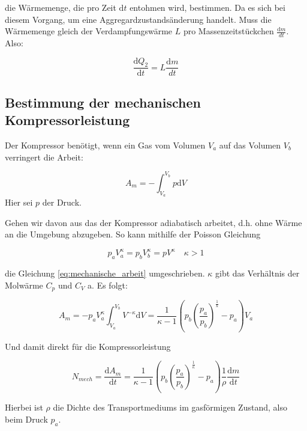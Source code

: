 die Wärmemenge, die pro Zeit $\mathup{d}t$ entohmen wird, bestimmen.
Da es sich bei diesem Vorgang, um eine Aggregardzustandsänderung handelt.
Muss die Wärmemenge gleich der Verdampfungswärme $L$ pro Massenzeitstückchen $\frac{\mathup{d}m}{dt}$.
Also:

\begin{equation*}
\frac{\mathup{d} Q_2}{\mathup{d} t}=L\frac{\mathup{d}m}{dt}
\end{equation*}

\subsection{Bestimmung der mechanischen Kompressorleistung}

Der Kompressor benötigt, wenn ein Gas vom Volumen $V_a$ auf das Volumen $V_b$ verringert
die Arbeit:

\begin{equation}
\label{eq:mechanische_arbeit}
A_m=-\int_{V_a}^{V_b}p\mathup{d}V
\end{equation}
Hier sei $p$ der Druck.

Gehen wir davon aus das der Kompressor adiabatisch arbeitet,
d.h. ohne Wärme an die Umgebung abzugeben. 
So kann mithilfe der Poisson Gleichung

\begin{equation*}
p_aV^{\kappa}_a=p_bV^{\kappa}_b=pV^{\kappa} \quad \kappa>1
\end{equation*}

die Gleichung \eqref{eq:mechanische_arbeit} umgeschrieben.
$\kappa$ gibt das Verhältnis der Molwärme $C_p$ und $C_V$ a.
Es folgt:

\begin{equation*}
A_m=-p_aV_a^{\kappa}\int_{V_a}^{V_b}V^{-\kappa}\mathup{d}V=\frac{1}{\kappa-1}\left(p_b\left(\frac{p_a}{p_b}\right)^{\frac{1}{k}}-p_a\right)V_a
\end{equation*}

Und damit direkt für die Kompressorleistung

\begin{equation*}
N_{mech}=\frac{\mathup{d}A_m}{\mathup{d}t}=\frac{1}{\kappa-1}\left(p_b\left(\frac{p_a}{p_b}\right)^{\frac{1}{\kappa}}-p_a\right)\frac{1}{\rho}\frac{\mathup{d}m}{\mathup{d}t}
\end{equation*}

Hierbei ist $\rho$ die Dichte des Transportmediums im gasförmigen Zustand, also beim Druck $p_a$.


